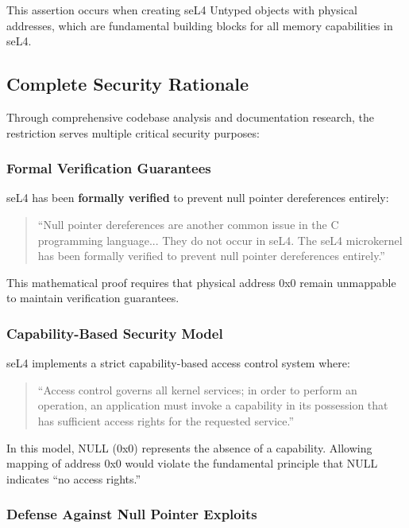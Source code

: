 \documentclass[11pt,a4paper]{article}
\begin{document}
This assertion occurs when creating seL4 Untyped objects with physical addresses, which are fundamental building blocks for all memory capabilities in seL4.

\subsection{Complete Security Rationale}

Through comprehensive codebase analysis and documentation research, the restriction serves multiple critical security purposes:

\subsubsection{Formal Verification Guarantees}

seL4 has been \textbf{formally verified} to prevent null pointer dereferences entirely:

\begin{quote}
``Null pointer dereferences are another common issue in the C programming language... They do not occur in seL4. The seL4 microkernel has been formally verified to prevent null pointer dereferences entirely.''
\end{quote}

This mathematical proof requires that physical address 0x0 remain unmappable to maintain verification guarantees.

\subsubsection{Capability-Based Security Model}

seL4 implements a strict capability-based access control system where:

\begin{quote}
``Access control governs all kernel services; in order to perform an operation, an application must invoke a capability in its possession that has sufficient access rights for the requested service.''
\end{quote}

In this model, NULL (0x0) represents the absence of a capability. Allowing mapping of address 0x0 would violate the fundamental principle that NULL indicates ``no access rights.''

\subsubsection{Defense Against Null Pointer Exploits}
\end{document}
